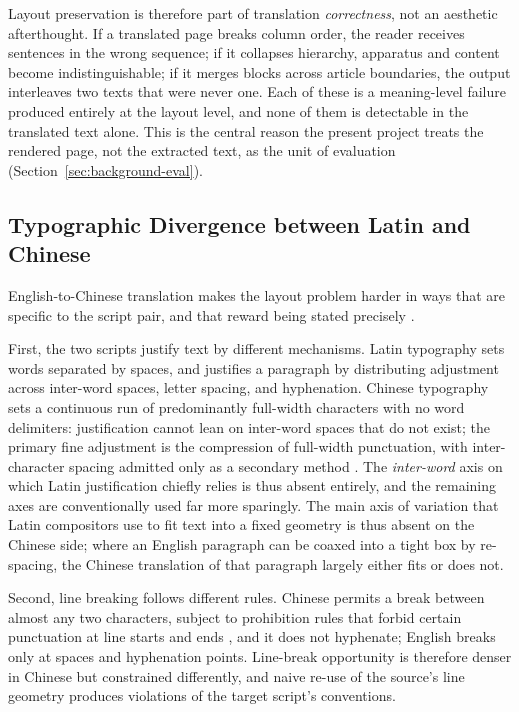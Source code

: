 Layout preservation is therefore part of translation
\emph{correctness}, not an aesthetic afterthought. If a translated
page breaks column order, the reader receives sentences in the wrong
sequence; if it collapses hierarchy, apparatus and content become
indistinguishable; if it merges blocks across article boundaries, the
output interleaves two texts that were never one. Each of these is a
meaning-level failure produced entirely at the layout level, and none
of them is detectable in the translated text alone. This is the
central reason the present project treats the rendered page, not the
extracted text, as the unit of evaluation
(Section~\ref{sec:background-eval}).

\subsection{Typographic Divergence between Latin and Chinese}
\label{sec:background-typography}

English-to-Chinese translation makes the layout problem harder in ways
that are specific to the script pair, and that reward being stated
precisely \cite{w3c_clreq}.

First, the two scripts justify text by different mechanisms. Latin
typography sets words separated by spaces, and justifies a paragraph
by distributing adjustment across inter-word spaces, letter spacing,
and hyphenation. Chinese typography sets a continuous run of
predominantly full-width characters with no word delimiters:
justification cannot lean on inter-word spaces that do not exist;
the primary fine adjustment is the compression of full-width
punctuation, with inter-character spacing admitted only as a
secondary method \cite{w3c_clreq}. The \emph{inter-word} axis on
which Latin justification chiefly relies is thus absent entirely,
and the remaining axes are conventionally used far more sparingly.
The main axis of variation that Latin compositors use to fit text into
a fixed geometry is thus absent on the Chinese side; where an English
paragraph can be coaxed into a tight box by re-spacing, the Chinese
translation of that paragraph largely either fits or does not.

Second, line breaking follows different rules. Chinese permits a break
between almost any two characters, subject to prohibition rules that
forbid certain punctuation at line starts and ends \cite{w3c_clreq},
and it does not hyphenate; English breaks only at spaces and
hyphenation points. Line-break opportunity is therefore denser in
Chinese but constrained differently, and naive re-use of the source's
line geometry produces violations of the target script's conventions.

